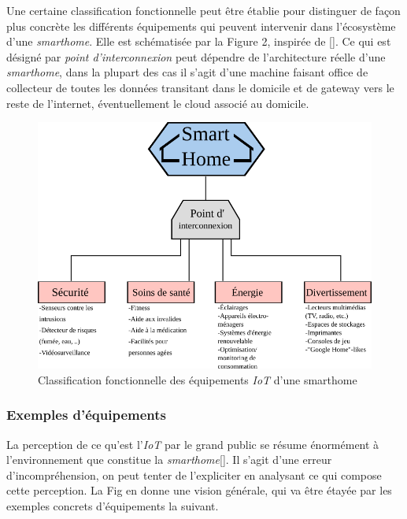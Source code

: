 \documentclass[]{article}
\begin{document}
\par Une certaine classification fonctionnelle peut être établie pour distinguer de façon plus concrète les différents équipements qui peuvent intervenir dans l'écosystème d'une \textit{smarthome}. Elle est schématisée par la Figure 2, inspirée de []. Ce qui est désigné par \textit{point d'interconnexion} peut dépendre de l'architecture réelle d'une \textit{smarthome}, dans la plupart des cas il s'agit d'une machine faisant office de collecteur de toutes les données transitant dans le domicile et de gateway vers le reste de l'internet, éventuellement le cloud associé au domicile.\\


\begin{figure}[!h]
\centering
\includegraphics[scale=1.2]{smarthome_class.png}
\caption{Classification fonctionnelle des équipements \textit{IoT} d'une smarthome}
\label{sm_class}
\end{figure}

\newpage

\subsubsection{Exemples d'équipements}

La perception de ce qu'est l'\textit{IoT} par le grand public se résume énormément à l'environnement que constitue la \textit{smarthome}[]. Il s'agit d'une erreur d'incompréhension, on peut tenter de l'expliciter en analysant ce qui compose cette perception. La Fig en donne une vision générale, qui va être étayée par les exemples concrets d'équipements la suivant.
\end{document}
